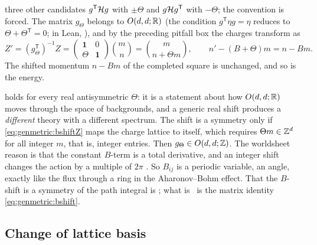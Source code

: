 three other candidates $g^{\mathsf T}\mathcal{H} g$ with $\pm\Theta$ and $g\mathcal{H} g^{\mathsf T}$ with
$-\Theta$; the convention is forced. The matrix $g_\Theta$ belongs to $O(d,d;\mathbb{R})$ (the
condition $g^{\mathsf T}\eta g=\eta$ reduces to $\Theta+\Theta^{\mathsf T}=0$; in Lean,
), and by the preceding pitfall box the charges
transform as
\begin{equation}\label{eq:genmetric:bshiftZ}
 Z'=(g_\Theta^{\mathsf T})^{-1}Z=\begin{pmatrix}\mathbf 1&0\\\Theta&\mathbf 1\end{pmatrix}
 \binom mn=\binom{m}{n+\Theta m},
 \qquad n'-(B+\Theta)m=n-Bm .
\end{equation}
The shifted momentum $n-Bm$ of the completed square is unchanged, and so is the energy.

\begin{physicsbox}
 holds for every real antisymmetric $\Theta$: it is a statement
about how $O(d,d;\mathbb{R})$ moves through the space of backgrounds, and a generic real shift
produces a \emph{different} theory with a different spectrum. The shift is a symmetry only
if \eqref{eq:genmetric:bshiftZ} maps the charge lattice to itself, which requires
$\Theta m\in\mathbb{Z}^d$ for all integer $m$, that is, integer entries. Then $g_\Theta\in O(d,d;\mathbb{Z})$.
The worldsheet reason is that the constant $B$-term is a total derivative, and an integer
shift changes the action by a multiple of $2\pi$ . So $B_{ij}$ is a periodic variable, an angle, exactly like the
flux through a ring in the Aharonov--Bohm effect. That the $B$-shift is a symmetry of the
path integral is \TL; what is \TA\ is the matrix identity \eqref{eq:genmetric:bshift}.
\end{physicsbox}

\subsection{Change of lattice basis}

